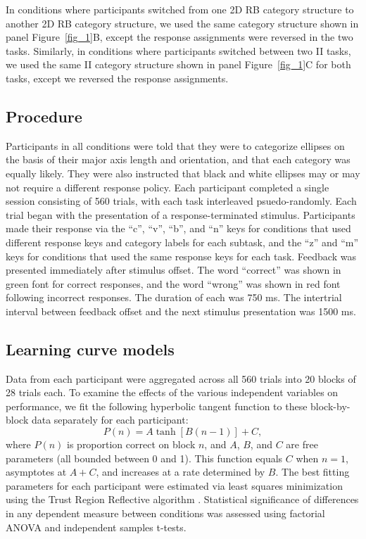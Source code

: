 \documentclass[doc, floatsintext]{apa7}
\begin{document}
In conditions where participants switched from one 2D RB
category structure to another 2D RB category structure, we
used the same category structure shown in panel
Figure~\ref{fig_1}B, except the response assignments were
reversed in the two tasks. Similarly, in conditions where
participants switched between two II tasks, we used the same
II category structure shown in panel Figure~\ref{fig_1}C for
both tasks, except we reversed the response assignments. 

\subsection{Procedure}
Participants in all conditions were told that they were to
categorize ellipses on the basis of their major axis length
and orientation, and that each category was equally likely.
They were also instructed that black and white ellipses may
or may not require a different response policy. Each
participant completed a single session consisting of 560
trials, with each task interleaved psuedo-randomly. Each
trial began with the presentation of a response-terminated
stimulus. Participants made their response via the ``c'',
``v'', ``b'', and ``n'' keys for conditions that used
different response keys and category labels for each
subtask, and the ``z'' and ``m'' keys for conditions that
used the same response keys for each task. Feedback was
presented immediately after stimulus offset. The word
``correct'' was shown in green font for correct responses,
and the word ``wrong'' was shown in red font following
incorrect responses. The duration of each was 750 ms. The
intertrial interval between feedback offset and the next
stimulus presentation was 1500 ms.

\subsection{Learning curve models}
Data from each participant were aggregated across all 560
trials into 20 blocks of 28 trials each. To examine the
effects of the various independent variables on performance,
we fit the following hyperbolic tangent function to these
block-by-block data separately for each participant:
\begin{equation}
    P(n) = A \tanh [B(n-1)] + C,
    \label{eq_learning_curve}
\end{equation}
where $P(n)$ is proportion correct on block $n$, and $A$,
$B$, and $C$ are free parameters (all bounded between 0 and
1). This function equals $C$ when $n=1$, asymptotes at $A +
C$, and increases at a rate determined by $B$. The best
fitting parameters for each participant were estimated via
least squares minimization using the Trust Region Reflective
algorithm \parencite{branch_subspace_1999}. Statistical
significance of differences in any dependent measure between
conditions was assessed using factorial ANOVA and
independent samples t-tests.
\end{document}

